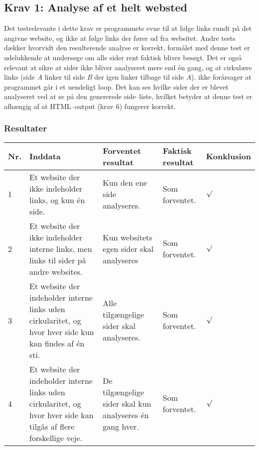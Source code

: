 \documentclass[a4paper,oneside,article]{memoir}
\begin{document}
\begin{landscape}
\section{Krav 1: Analyse af et helt websted}
Det testrelevante i dette krav er programmets evne til at følge links
rundt på det angivne website, og ikke at følge links der fører ud fra
websitet. Andre tests dækker hvorvidt den resulterende analyse er
korrekt, formålet med denne test er udelukkende at undersøge om alle
sider rent faktisk bliver besøgt. Det er også relevant at sikre at
sider ikke bliver analyseret mere end én gang, og at cirkulære links
(side \textit{A} linker til side \textit{B} der igen linker tilbage
til side \textit{A}). ikke forårsager at programmet går i et uendeligt
loop. Det kan ses hvilke sider der er blevet analyseret ved at se på
den genererede side--liste, hvilket betyder at denne test er afhængig
af at HTML--output (krav 6) fungerer korrekt.

\subsubsection{Resultater}
\begin{longtable}[c]{p{20pt}|p{220pt}|p{130pt}|p{130pt}|p{50pt}}
\textbf{Nr.} &
\textbf{Inddata} &
\textbf{Forventet resultat} &
\textbf{Faktisk resultat} &
\textbf{Konklusion} \\ \hline

1 &
Et website der ikke indeholder links, og kun én side. &
Kun den ene side analyseres. &
Som forventet. &
$\surd$ \\ \hline

2 &
Et website der ikke indeholder interne links, men links til
sider på andre websites. &
Kun websitets egen sider skal analyseres &
Som forventet. &
$\surd$ \\ \hline

3 &
Et website der indeholder interne links uden cirkularitet, og
hvor hver side kun kan findes af én sti. &
Alle tilgængelige sider skal analyseres. &
Som forventet. &
$\surd$ \\ \hline

4 &
Et website der indeholder interne links uden cirkularitet, og hvor
hver side kan tilgås af flere forskellige veje. &
De tilgængelige sider skal kun analyseres én gang hver. &
Som forventet. &
$\surd$ \\ \hline


\end{longtable}
\end{landscape}
\end{document}

